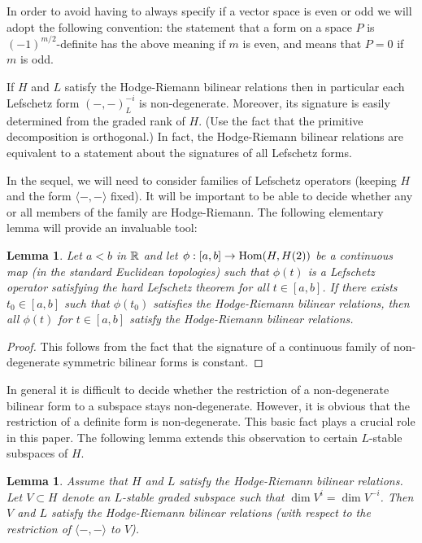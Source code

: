 \documentclass[11pt]{amsart}
\numberwithin{equation}{section}
\def\to{\rightarrow}
\newtheorem{lem}[thm]{Lemma}
\theoremstyle{definition}
\theoremstyle{remark}
\begin{document}
In order to avoid having to always specify if a vector space is even
or odd we will adopt the following convention: the statement that a
form on a space $P$ is $(-1)^{m/2}$-definite has the above meaning if
$m$ is even, and means that $P = 0$ if $m$ is odd.

If $H$ and $L$ satisfy the Hodge-Riemann bilinear relations then in particular each Lefschetz form $( -, -)^{-i}_L$ is non-degenerate. Moreover, its signature is easily determined from
the graded rank of $H$. (Use the fact that the primitive decomposition is orthogonal.) In fact, the Hodge-Riemann bilinear relations are equivalent to a statement about the signatures of
all Lefschetz forms.

In the sequel, we will need to consider families of Lefschetz operators (keeping $H$ and the form $\langle -, - \rangle$ fixed). It will be important to be able to
decide whether any or all members of the family are Hodge-Riemann. The following elementary lemma will provide an invaluable tool:

\begin{lem} \label{lem:family} Let $a < b$ in ${\mathbb{R}}$ and let $\phi :
  [a,b] \to \Hom(H,H(2))$ be a continuous map (in the standard
  Euclidean topologies) such that $\phi(t)$ is a
  Lefschetz operator satisfying the hard Lefschetz theorem for all $t
  \in [a,b]$. If there exists $t_0 \in [a,b]$ such that $\phi(t_0)$ satisfies the Hodge-Riemann bilinear relations, then all $\phi(t)$ for $t \in [a,b]$ satisfy the Hodge-Riemann bilinear
relations. \end{lem}

\begin{proof} This follows from the fact that the signature of a continuous family of non-degenerate symmetric bilinear forms is constant. \end{proof}

In general it is difficult to decide whether the restriction of a non-degenerate bilinear form to a subspace stays non-degenerate. However, it is obvious that the restriction of a 
definite form is non-degenerate. This basic fact plays a crucial role in this paper. The following lemma extends this observation to certain $L$-stable subspaces of $H$.

\begin{lem} \label{lem: HR subspace} Assume that $H$ and $L$
  satisfy the Hodge-Riemann bilinear relations. Let $V \subset H$
  denote an $L$-stable graded subspace such
that $\dim V^i = \dim V^{-i}$. Then $V$ and $L$ satisfy the Hodge-Riemann bilinear relations (with respect to the restriction of $\langle-,-\rangle$ to $V$). \end{lem}
\end{document}
